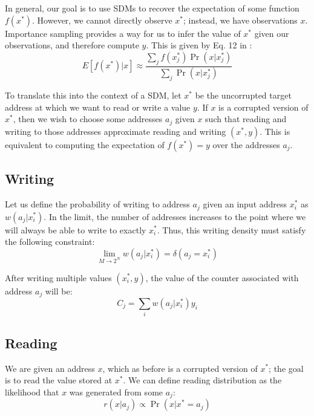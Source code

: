 \documentclass[10pt,letterpaper]{article}
\begin{document}
In general, our goal is to use SDMs to recover the expectation of some
function $f(x^*)$. However, we cannot directly observe $x^*$; instead,
we have observations $x$. Importance sampling provides a way for us to
infer the value of $x^*$ given our observations, and therefore compute
$y$. This is given by Eq. 12 in :
\begin{equation}
E[f(x^*)|x]\approx \frac{\sum_j f(x_j^*)\Pr(x|x_j^*)}{\sum_j \Pr(x|x_j^*)}
\end{equation}

To translate this into the context of a SDM, let $x^*$ be the
uncorrupted target address at which we want to read or write a value
$y$. If $x$ is a corrupted version of $x^*$, then we wish to choose
some addresses $a_j$ given $x$ such that reading and writing to those
addresses approximate reading and writing $(x^*,y)$. This is
equivalent to computing the expectation of $f(x^*)=y$ over the
addresses $a_j$.

\subsection{Writing}

Let us define the probability of writing to address $a_j$ given an
input address $x_i^*$ as $w(a_j|x_i^*)$. In the limit, the number of
addresses increases to the point where we will always be able to write
to exactly $x_i^*$. Thus, this writing density must satisfy the
following constraint:
\begin{equation}
\lim_{M\rightarrow 2^N}w(a_j|x_i^*) = \delta(a_j=x_i^*)
\label{eq:w}
\end{equation}

After writing multiple values $(x_i^*, y)$, the value of the counter
associated with address $a_j$ will be:
\begin{equation}
C_j=\sum_i w(a_j|x_i^*)y_i
\label{eq:Cj}
\end{equation}

\subsection{Reading}

We are given an address $x$, which as before is a corrupted version of
$x^*$; the goal is to read the value stored at $x^*$. We can define
reading distribution as the likelihood that $x$ was generated from
some $a_j$:
\begin{equation}
r(x| a_j)\propto \Pr(x|x^*=a_j)
\label{eq:r}
\end{equation}
\end{document}
